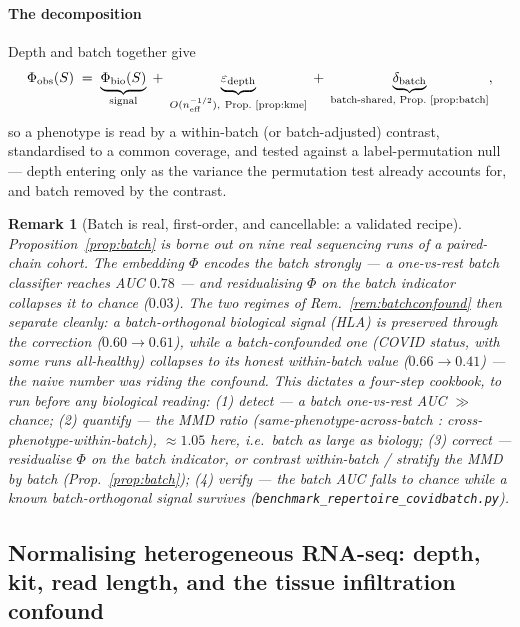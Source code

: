 \documentclass[11pt]{article}
\theoremstyle{oldplain}
\theoremstyle{oldrem}
\newtheorem{remark}{Remark}
\newcommand{\code}[1]{\texttt{#1}}
\begin{document}
\paragraph{The decomposition} Depth and batch together give
\begin{equation}\label{eq:decomp}
  \Phi_{\mathrm{obs}}(S)\;=\;\underbrace{\Phi_{\mathrm{bio}}(S)}_{\text{signal}}
  \;+\;\underbrace{\varepsilon_{\mathrm{depth}}}_{O(n_{\mathrm{eff}}^{-1/2}),\ \text{Prop.~\ref{prop:kme}}}
  \;+\;\underbrace{\delta_{\mathrm{batch}}}_{\text{batch-shared, Prop.~\ref{prop:batch}}},
\end{equation}
so a phenotype is read by a within-batch (or batch-adjusted) contrast, standardised to a common coverage, and
tested against a label-permutation null --- depth entering only as the variance the permutation test already
accounts for, and batch removed by the contrast.

\begin{remark}[Batch is real, first-order, and cancellable: a validated recipe]\label{rem:batchvalidated}
Proposition~\ref{prop:batch} is borne out on nine real sequencing runs of a paired-chain cohort. The embedding
$\Phi$ encodes the batch strongly --- a one-vs-rest batch classifier reaches {\scshape AUC} $0.78$ --- and
\emph{residualising $\Phi$ on the batch indicator collapses it to chance} ($0.03$). The two regimes of
Rem.~\ref{rem:batchconfound} then separate cleanly: a batch-\emph{orthogonal} biological signal ({\scshape HLA})
is \emph{preserved} through the correction ($0.60\to0.61$), while a batch-\emph{confounded} one ({\scshape COVID}
status, with some runs all-healthy) collapses to its honest within-batch value ($0.66\to0.41$) --- the naive
number was riding the confound. This dictates a four-step cookbook, to run before any biological reading:
\emph{(1) detect} --- a batch one-vs-rest {\scshape AUC} $\gg$ chance; \emph{(2) quantify} --- the {\scshape MMD}
ratio (same-phenotype-across-batch : cross-phenotype-within-batch), $\approx1.05$ here, i.e.\ batch as large as
biology; \emph{(3) correct} --- residualise $\Phi$ on the batch indicator, or contrast within-batch / stratify
the {\scshape MMD} by batch (Prop.~\ref{prop:batch}); \emph{(4) verify} --- the batch {\scshape AUC} falls to
chance while a known batch-orthogonal signal survives (\code{benchmark\_repertoire\_covidbatch.py}).
\end{remark}

\subsection{Normalising heterogeneous {\normalfont\scshape RNA}-seq: depth, kit, read length, and the tissue
infiltration confound}\label{sec:samp-norm}
\end{document}
